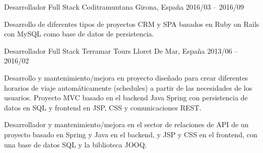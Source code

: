 \documentclass[]{awesome-cv}
\begin{document}
\begin{cventries}
	\cventry
	{Desarrollador Full Stack}
	{Coditramuntana}
	{Girona, España}
	{2016/03 – 2016/09}
	{\begin{cvitems}
		\vspace{0.5mm}
		\item {Desarrollo de diferentes tipos de proyectos CRM y SPA basados en Ruby on Rails con MySQL como base de datos de persistencia.}
		\end{cvitems}}


	\cventry
	{Desarrollador Full Stack}
	{Terramar Tours}
	{Lloret De Mar, España}
	{2013/06 – 2016/02}
	{\begin{cvitems}
		\vspace{0.5mm}
		\item {Desarrollo y mantenimiento/mejora en proyecto diseñado para crear diferentes horarios de viaje automáticamente (schedules) a partir de las necesidades de los usuarios. Proyecto MVC basado en el backend Java Spring con persistencia de datos en SQL y frontend en JSP, CSS y comunicaciones REST.}
  \item {Desarrollador y mantenimiento/mejora en el sector de relaciones de API de un proyecto basado en Spring y Java en el backend, y JSP y CSS en el frontend, con una base de datos SQL y la biblioteca JOOQ.}
		\end{cvitems}}
\end{cventries}
\end{document}
